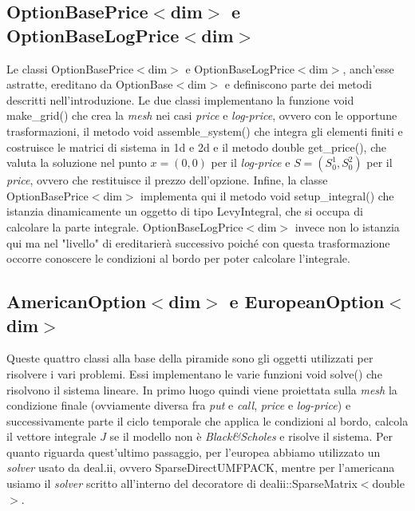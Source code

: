 \documentclass[a4paper,10pt]{report}
\theoremstyle{plain}
\theoremstyle{definition}
\theoremstyle{remark}
\begin{document}
\subsection{\textsf{OptionBasePrice$<$dim$>$} e \textsf{OptionBaseLogPrice$<$dim$>$}}
Le classi \textsf{OptionBasePrice$<$dim$>$} e \textsf{OptionBaseLogPrice$<$dim$>$}, anch'esse astratte, ereditano da \textsf{OptionBase$<$dim$>$} e definiscono parte dei metodi descritti nell'introduzione. Le due classi implementano la funzione \textsf{void make\_grid()} che crea la \emph{mesh} nei casi \emph{price} e \emph{log-price}, ovvero con le opportune trasformazioni, il metodo \textsf{void assemble\_system()} che integra gli elementi finiti e costruisce le matrici di sistema in 1d e 2d e il metodo \textsf{double get\_price()}, che valuta la soluzione nel punto $x=(0,0)$ per il \emph{log-price} e $S=(S_0^1, S_0^2)$ per il \emph{price}, ovvero che restituisce il prezzo dell'opzione. Infine, la classe \textsf{OptionBasePrice$<$dim$>$} implementa qui il metodo \textsf{void setup\_integral()} che istanzia dinamicamente un oggetto di tipo \textsf{LevyIntegral}, che si occupa di calcolare la parte integrale. \textsf{OptionBaseLogPrice$<$dim$>$} invece non lo istanzia qui ma nel "livello" di ereditarier\`a successivo poich\'e con questa trasformazione occorre conoscere le condizioni al bordo per poter calcolare l'integrale.
\subsection{\textsf{AmericanOption$<$dim$>$} e \textsf{EuropeanOption$<$dim$>$}}
Queste quattro classi alla base della piramide sono gli oggetti utilizzati per risolvere i vari problemi. Essi implementano le varie funzioni \textsf{void solve()} che risolvono il sistema lineare. In primo luogo quindi viene proiettata sulla \emph{mesh} la condizione finale (ovviamente diversa fra \emph{put} e \emph{call}, \emph{price} e \emph{log-price}) e successivamente parte il ciclo temporale che applica le condizioni al bordo, calcola il vettore integrale $J$ se il modello non \`e \emph{Black\&Scholes} e risolve il sistema. Per quanto riguarda quest'ultimo passaggio, per l'europea abbiamo utilizzato un \emph{solver} usato da \textsf{deal.ii}, ovvero \textsf{SparseDirectUMFPACK}, mentre per l'americana usiamo il \emph{solver} scritto all'interno del decoratore di \textsf{dealii::SparseMatrix$<$double$>$}.

\end{document}
